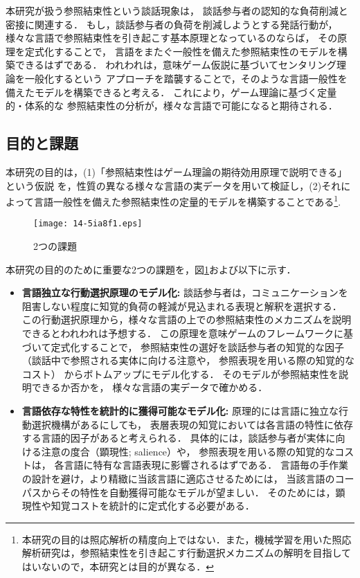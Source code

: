 \documentclass[japanese]{jnlp_1.3e}
\begin{document}
本研究が扱う参照結束性という談話現象は，
談話参与者の認知的な負荷削減と密接に関連する．
もし，談話参与者の負荷を削減しようとする発話行動が，
様々な言語で参照結束性を引き起こす基本原理となっているのならば，
その原理を定式化することで，
言語をまたぐ一般性を備えた参照結束性のモデルを構築できるはずである．
われわれは，意味ゲーム仮説に基づいてセンタリング理論を一般化するという
アプローチを踏襲することで，そのような言語一般性を備えたモデルを構築できると考える．
これにより，ゲーム理論に基づく定量的・体系的な
参照結束性の分析が，様々な言語で可能になると期待される．



\subsection{目的と課題}
本研究の目的は，(1)「参照結束性はゲーム理論の期待効用原理で説明できる」という仮説 を，性質の異なる様々な言語の実データを用いて検証し，(2)それによって言語一般性を備えた参照結束性の定量的モデルを構築することである\footnote{
	本研究の目的は照応解析の精度向上ではない．また，機械学習を用いた照応解析研究は，参照結束性を引き起こす行動選択メカニズムの解明を目指してはいないので，本研究とは目的が異なる．}.

\begin{figure}[b]
\begin{center}
      \texttt{[image: 14-5ia8f1.eps]}
  \caption{2つの課題}
  \label{fig:issues}
\vspace{-\normalbaselineskip}
 \end{center}
\end{figure}


本研究の目的のために重要な2つの課題を，図\ref{fig:issues}および以下に示す．
\begin{itemize}
\item[1.] {\bf 言語独立な行動選択原理のモデル化: } 
談話参与者は，コミュニケーションを阻害しない程度に知覚的負荷の軽減が見込まれる表現と解釈を選択する．
この行動選択原理から，様々な言語の上での参照結束性のメカニズムを説明できるとわれわれは予想する．
この原理を意味ゲームのフレームワークに基づいて定式化することで，
参照結束性の選好を談話参与者の知覚的な因子
（談話中で参照される実体に向ける注意や，
参照表現を用いる際の知覚的なコスト）
からボトムアップにモデル化する．
そのモデルが参照結束性を説明できるか否かを，
様々な言語の実データで確かめる．
\item[2.] {\bf 言語依存な特性を統計的に獲得可能なモデル化: }
原理的には言語に独立な行動選択機構があるにしても，
表層表現の知覚においては各言語の特性に依存する言語的因子があると考えられる．
具体的には，談話参与者が実体に向ける注意の度合（顕現性; salience）や，
参照表現を用いる際の知覚的なコストは，
各言語に特有な言語表現に影響されるはずである．
言語毎の手作業の設計を避け，より精緻に当該言語に適応させるためには，
当該言語のコーパスからその特性を自動獲得可能なモデルが望ましい．
そのためには，顕現性や知覚コストを統計的に定式化する必要がある．
\end{itemize}
\end{document}
